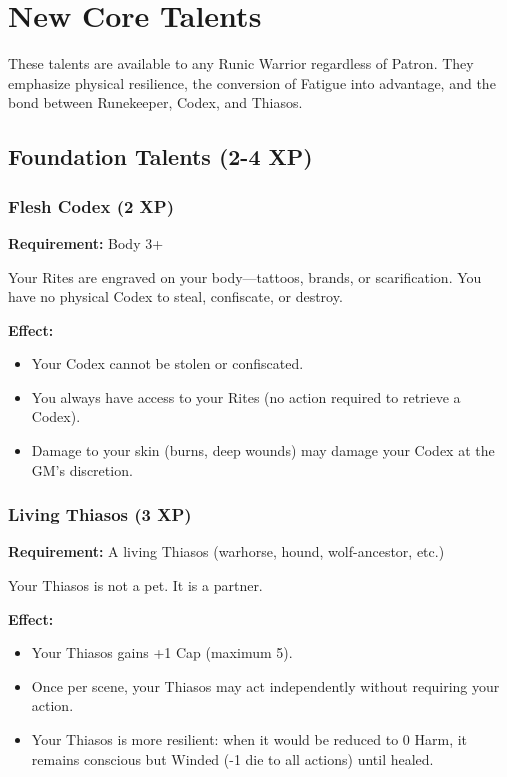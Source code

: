 \section{New Core Talents}

These talents are available to any Runic Warrior regardless of Patron. They emphasize physical resilience, the conversion of Fatigue into advantage, and the bond between Runekeeper, Codex, and Thiasos.

\subsection{Foundation Talents (2-4 XP)}

\subsubsection{Flesh Codex (2 XP)}

\textbf{Requirement:} Body 3+

Your Rites are engraved on your body—tattoos, brands, or scarification. You have no physical Codex to steal, confiscate, or destroy.

\textbf{Effect:}
\begin{itemize}
\item Your Codex cannot be stolen or confiscated.
\item You always have access to your Rites (no action required to retrieve a Codex).
\item Damage to your skin (burns, deep wounds) may damage your Codex at the GM's discretion.
\end{itemize}

\subsubsection{Living Thiasos (3 XP)}

\textbf{Requirement:} A living Thiasos (warhorse, hound, wolf-ancestor, etc.)

Your Thiasos is not a pet. It is a partner.

\textbf{Effect:}
\begin{itemize}
\item Your Thiasos gains +1 Cap (maximum 5).
\item Once per scene, your Thiasos may act independently without requiring your action.
\item Your Thiasos is more resilient: when it would be reduced to 0 Harm, it remains conscious but Winded (-1 die to all actions) until healed.
\end{itemize}

